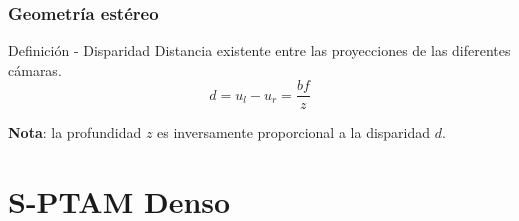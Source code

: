 \documentclass[compress]{beamer}
\begin{document}
\begin{frame}
	\frametitle{Geometría estéreo}

	\begin{block}{Definición - Disparidad}
		Distancia existente entre las proyecciones de las diferentes cámaras.
	\begin{equation}
		d=u_{l}-u_{r}=\frac{bf}{z}
	\end{equation}
	\end{block}

	\textbf{Nota}: la profundidad $z$ es inversamente proporcional a la disparidad $d$.

	\vspace{-1em}
	\begin{figure}[!htb]
		\centering
		\hfill
		\centering
		\hfill
	\end{figure}

\end{frame}


\section{S-PTAM Denso}
\end{document}
